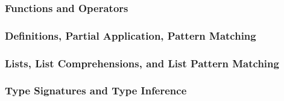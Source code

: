 \begin{frame}[fragile]
  \frametitle{Functions and Operators}

  
\end{frame}

\begin{frame}[fragile]
  \frametitle{Definitions, Partial Application, Pattern Matching}

  
\end{frame}

\begin{frame}[fragile]
    \frametitle{Lists, List Comprehensions, and List Pattern Matching}

    
\end{frame}

\begin{frame}[fragile]
  \frametitle{Type Signatures and Type Inference}

  
\end{frame}
